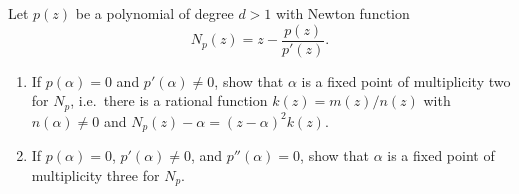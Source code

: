 \begin{problem}{5}
  Let $p(z)$ be a polynomial of degree $d > 1$ with Newton function
  $$\displaystyle N_p(z) = z - \frac{p(z)}{p'(z)}.$$
  \begin{enumerate}
    \item If $p(\alpha) = 0$ and $p'(\alpha) \neq 0$, show that $\alpha$ is a fixed point
      of multiplicity two for $N_p$, i.e.\ there is a rational function $k(z) = m(z) / n(z)$ with
      $n(\alpha) \neq 0$ and $N_p(z) - \alpha = (z-\alpha)^2 k(z)$.
    \item If $p(\alpha) = 0$, $p'(\alpha) \neq 0$, and $p''(\alpha) = 0$, show that $\alpha$
      is a fixed point of multiplicity three for $N_p$.
  \end{enumerate}
\end{problem}

